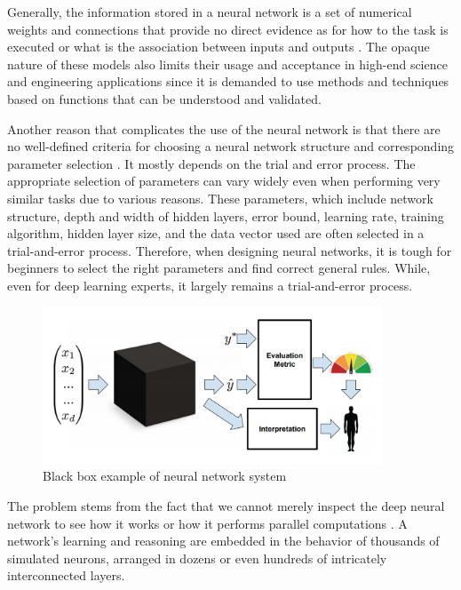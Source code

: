 Generally, the information stored in a neural network is a set of numerical weights and connections that provide no direct evidence as for how to the task is executed or what is the association between inputs and outputs \cite{Tzeng2005}. The opaque nature of these models also limits their usage and acceptance in high-end science and engineering applications since it is demanded to use methods and techniques based on functions that can be understood and validated.

Another reason that complicates the use of the neural network is that there are no well-defined criteria for choosing a neural network structure and corresponding parameter selection \cite{dlvwz}. It mostly depends on the trial and error process. The appropriate selection of parameters can vary widely even when performing very similar tasks due to various reasons. These parameters, which include network structure, depth and width of hidden layers, error bound, learning rate, training algorithm, hidden layer size, and the data vector used are often selected in a trial-and-error process. Therefore, when designing neural networks, it is tough for beginners to select the right parameters and find correct general rules. While, even for deep learning experts, it largely remains a trial-and-error process.

\begin{figure}[htbp]
\centering
\includegraphics[width=0.90\textwidth]{images/Black-box.png}
\caption{Black box example of neural network system}
\label{fig:blackbox}
\end{figure}

The problem stems from the fact that we cannot merely inspect the deep neural network to see how it works or how it performs parallel computations \cite{darksecretaimittr}. A network’s learning and reasoning are embedded in the behavior of thousands of simulated neurons, arranged in dozens or even hundreds of intricately interconnected layers. 

